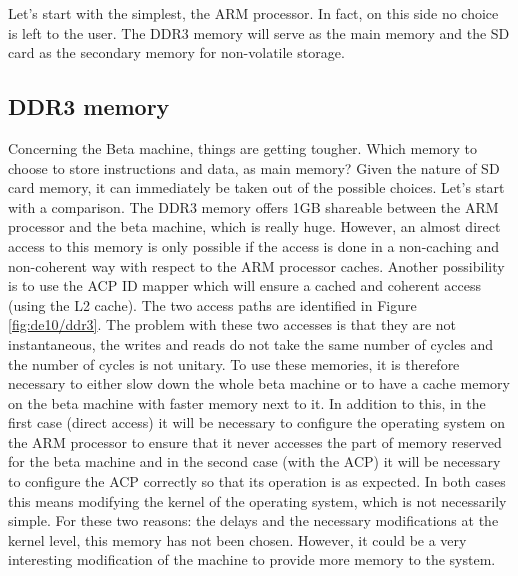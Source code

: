 Let's start with the simplest, the ARM processor. In fact, on this side no choice is left to the 
user. The DDR3 memory will serve as the main memory and the SD card as the secondary memory for 
non-volatile storage. 

\subsection{DDR3 memory}

Concerning the Beta machine, things are getting tougher.  Which memory to choose to store 
instructions and data, as main memory? Given the nature of SD card memory, it can immediately be 
taken out of the possible choices. Let's start with a comparison. The DDR3 memory offers 1GB 
shareable between the ARM processor and the beta machine, which is really huge. However, an almost 
direct access to this memory is only possible if the access is done in a non-caching and 
non-coherent way with respect to the ARM processor caches. Another possibility is to use the ACP 
ID mapper which will ensure a cached and coherent access (using the L2 cache). The two access paths 
are identified in Figure \ref{fig:de10/ddr3}. The problem with these two accesses is that they are 
not instantaneous, the writes and reads do not take the same number of cycles and the number of 
cycles is not unitary. To use these memories, it is therefore necessary to either slow down the 
whole beta machine or to have a cache memory on the beta machine with faster memory next to it. In 
addition to this, in the first case (direct access) it will be necessary to configure the operating 
system on the ARM processor to ensure that it never accesses the part of memory reserved for the
beta machine and in the second case (with the ACP) it will be necessary to configure the ACP 
correctly so that its operation is as expected. In both cases this means modifying the kernel of the 
operating system, which is not necessarily simple. For these two reasons: the delays and the 
necessary modifications at the kernel level, this memory has not been chosen. However, it could be 
a very interesting modification of the machine to provide more memory to the system.

